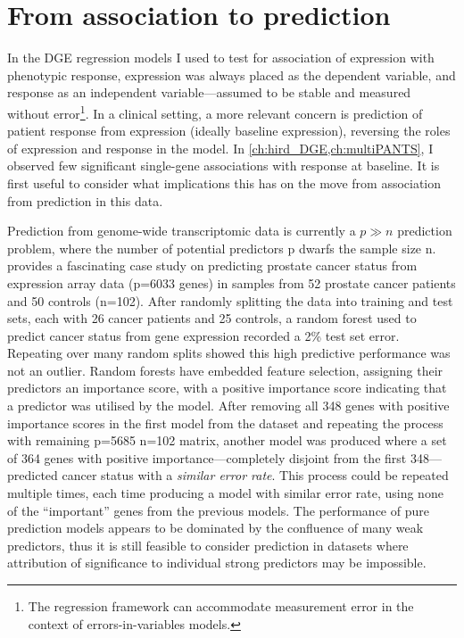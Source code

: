 \section{From association to prediction}

In the \gls{DGE} regression models I used to test for association of expression with phenotypic response,
expression was always placed as the dependent variable, 
and response as an independent variable---assumed to be stable and measured without error\footnote{The regression framework can accommodate measurement error in the context of errors-in-variables models.}.
In a clinical setting, a more relevant concern is prediction of patient response from expression (ideally baseline expression),
reversing the roles of expression and response in the model.
In \cref{ch:hird_DGE,ch:multiPANTS},
I observed few significant single-gene associations with response at baseline.
It is first useful to consider what implications this has on the move from association from prediction in this data.

Prediction from genome-wide transcriptomic data is currently a $p \gg n$ prediction problem,
where the number of potential predictors p dwarfs the sample size n.
\textcite{efron2020PredictionEstimationAttribution} provides a fascinating case study on predicting prostate cancer status from expression array data (p=6033 genes) in 
samples from 52 prostate cancer patients and 50 controls (n=102).
After randomly splitting the data into training and test sets, each with 26 cancer patients and 25 controls,
a random forest used to predict cancer status from gene expression recorded a 2\% test set error.
Repeating over many random splits showed this high predictive performance was not an outlier.
Random forests have embedded feature selection, assigning their predictors an importance score, 
with a positive importance score indicating that a predictor was utilised by the model.
After removing all 348 genes with positive importance scores in the first model from the dataset and repeating the process with remaining p=5685 n=102 matrix,
another model was produced where a set of 364 genes with positive importance---completely disjoint from the first 348---predicted cancer status with a \emph{similar error rate}.
This process could be repeated multiple times, each time producing a model with similar error rate, using none of the \enquote{important} genes from the previous models.
The performance of pure prediction models appears to be dominated by the confluence of many weak predictors,
thus it is still feasible to consider prediction in datasets where attribution of significance to individual strong predictors may be impossible.

